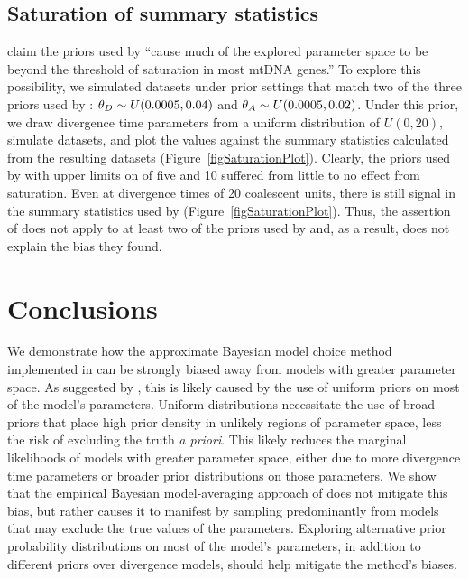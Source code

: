 \documentclass[letterpaper,12pt]{article}
\begin{document}
\begin{linenumbers}
\subsection*{Saturation of summary statistics}
\citet{Hickerson2013} claim the priors used by \citet{Oaks2012} ``cause much of
the explored parameter space to be beyond the threshold of saturation in most
mtDNA genes.'' To explore this possibility, we simulated datasets under prior
settings that match two of the three priors used by \citet{Oaks2012}:
$\meanDescendantTheta{} \sim U(0.0005, 0.04)$ and $\ancestralTheta{} \sim
U(0.0005, 0.02)$.
Under this prior, we draw divergence time parameters from a uniform
distribution of $U(0, 20)$, simulate datasets, and plot the \divt{} values
against the summary statistics calculated from the resulting datasets
(Figure~\ref{figSaturationPlot}).
Clearly, the priors used by \citet{Oaks2012} with upper limits on \divt{} of five
and 10 suffered from little to no effect from saturation.
Even at divergence times of 20 coalescent units, there is still signal in the
summary statistics used by \msb (Figure~\ref{figSaturationPlot}).
Thus, the assertion of \citet{Hickerson2013} does not apply to at least
two of the priors used by \citet{Oaks2012} and, as a result, does not
explain the bias they found.



\section*{Conclusions}
We demonstrate how the approximate Bayesian model choice method implemented in
\msb can be strongly biased away from models with greater parameter space.
As suggested by \citet{Oaks2012}, this is likely caused by the use of uniform
priors on most of the model's parameters.
Uniform distributions necessitate the use of broad priors that place high prior
density in unlikely regions of parameter space, less the risk of excluding the
truth \emph{a priori}.
This likely reduces the marginal likelihoods of models with greater parameter
space, either due to more divergence time parameters or broader prior
distributions on those parameters.
We show that the empirical Bayesian model-averaging approach of
\citet{Hickerson2013} does not mitigate this bias, but rather causes it to
manifest by sampling predominantly from models that may exclude the true values
of the parameters.
Exploring alternative prior probability distributions on most of the model's
parameters, in addition to different priors over divergence models, should
help mitigate the method's biases.


\end{linenumbers}
\end{document}
